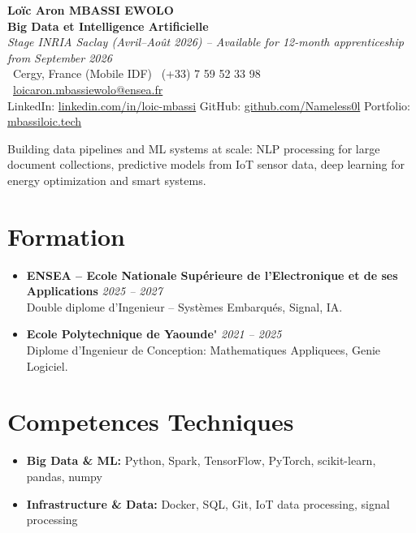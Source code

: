 \documentclass[a4paper,11pt]{article}
\begin{document}
\begin{center}
    {\Large \textbf{Lo\"ic Aron MBASSI EWOLO}} \\ \vspace{4pt}
    \textbf{\large Big Data et Intelligence Artificielle} \\
    \textit{\small Stage INRIA Saclay (Avril--Ao\^ut 2026) -- Available for 12-month apprenticeship from September 2026} \\ \vspace{4pt}
    \small
    \Pointinghand\ Cergy, France (Mobile IDF) \quad
    \Mobilefone\ (+33) 7 59 52 33 98 \quad
    {\color{primary}\Letter\ \href{mailto:loicaron.mbassiewolo@ensea.fr}{loicaron.mbassiewolo@ensea.fr}} \\ \vspace{2pt}
    {\color{primary}LinkedIn: \href{https://www.linkedin.com/in/loic-mbassi/}{linkedin.com/in/loic-mbassi}} \quad
    {\color{primary}GitHub: \href{https://github.com/Nameless0l}{github.com/Nameless0l}} \quad
    {\color{primary}Portfolio: \href{https://mbassiloic.tech}{mbassiloic.tech}}
\end{center}

\vspace{-6pt}

\noindent\small{Building data pipelines and ML systems at scale: NLP processing for large document collections, predictive models from IoT sensor data, deep learning for energy optimization and smart systems.}

\section{Formation}
\begin{itemize}[leftmargin=*, label=\tiny$\bullet$, nosep]
    \item \textbf{ENSEA -- Ecole Nationale Sup\'erieure de l'Electronique et de ses Applications} \hfill \textit{2025 -- 2027} \\
    \small{Double diplome d'Ingenieur -- Syst\`emes Embarqu\'es, Signal, IA.}
    \item \textbf{Ecole Polytechnique de Yaounde\'} \hfill \textit{2021 -- 2025} \\
    \small{Diplome d'Ingenieur de Conception: Mathematiques Appliquees, Genie Logiciel.}
\end{itemize}

\section{Competences Techniques}
\begin{itemize}[leftmargin=*, nosep]
    \item \small{\textbf{Big Data \& ML:} Python, Spark, TensorFlow, PyTorch, scikit-learn, pandas, numpy}
    \item \small{\textbf{Infrastructure \& Data:} Docker, SQL, Git, IoT data processing, signal processing}
\end{itemize}
\end{document}

